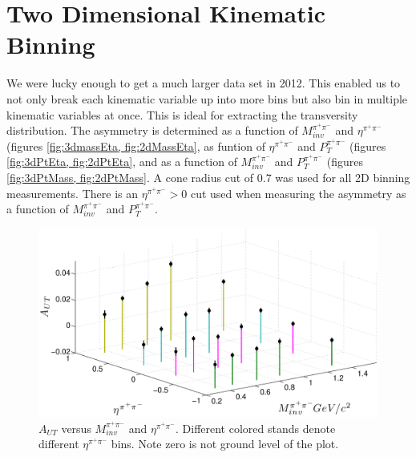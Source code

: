 \documentclass[abstract = on,listof=totoc, bibliography=totoc]{scrreprt}
\newcommand{\ptpair}{P_{T}^{\pi^+\pi^-}}
\newcommand{\mpair}{M_{inv}^{\pi^+\pi^-}}
\newcommand{\etapair}{\eta^{\pi^+\pi^-}}
\begin{document}
\section{Two Dimensional Kinematic Binning}
\label{sec:2dresults}

We were lucky enough to get a much larger data set in 2012. This enabled us to not only break each kinematic variable up into more bins but also bin in multiple kinematic variables at once. This is ideal for extracting the transversity distribution. The asymmetry is determined as a function of $\mpair$ and $\etapair$ (figures \ref{fig:3dmassEta, fig:2dMassEta}, as funtion of $\etapair$ and $\ptpair$ (figures \ref{fig:3dPtEta, fig:2dPtEta}, and as a function of $\mpair$ and $\ptpair$ (figures \ref{fig:3dPtMass, fig:2dPtMass}. A cone radius cut of 0.7 was used for all 2D binning measurements. There is an $\etapair > 0$ cut used when measuring the asymmetry as a function of $\mpair$ and $\ptpair$.  




\begin{figure}
\begin{center}
\includegraphics[width = 1\textwidth]{massEta3d82415}
\caption[Asymmetry vs $\etapair$ and $\mpair$ 2D binning]{$A_{UT}$ versus $\mpair$ and $\etapair$. Different colored stands denote different $\etapair$ bins. Note zero is not ground level of the plot.}
\label{fig:3dmassEta}
\end{center}
\end{figure}
\end{document}
